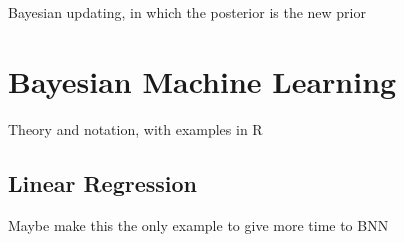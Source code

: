 Bayesian updating, in which the posterior is the new prior


\section{Bayesian Machine Learning} %

Theory and notation, with examples in R

\subsection{Linear Regression}
Maybe make this the only example to give more time to BNN











